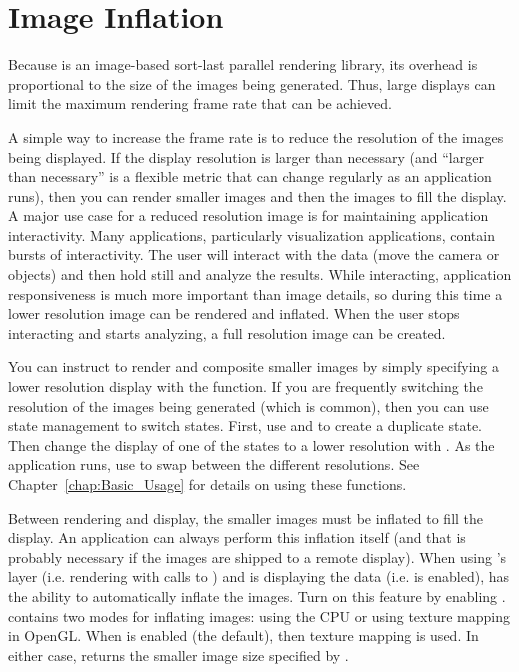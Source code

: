 


\section{Image Inflation}
\label{sec:Customizing_Compositing:Image_Inflation}

Because \IceT is an image-based sort-last parallel
rendering library, its overhead is proportional to the size of the images
being generated.  Thus, large displays can limit the maximum rendering
frame rate that can be achieved.

A simple way to increase the frame rate is to reduce the resolution of the
images being displayed.  If the display resolution is larger than necessary
(and ``larger than necessary'' is a flexible metric that can change
regularly as an application runs), then you can render smaller images and
then  the images to fill the display.  A major use case
for a reduced resolution image is for maintaining application
interactivity.  Many applications, particularly visualization applications,
contain bursts of interactivity.  The user will interact with the data
(move the camera or objects) and then hold still and analyze the results.
While interacting, application responsiveness is much more important than
image details, so during this time a lower resolution image can be rendered
and inflated.  When the user stops interacting and starts analyzing, a full
resolution image can be created.

You can instruct \IceT to render and composite smaller images by simply
specifying a lower resolution display with the 
function.  If you are frequently switching the resolution of the images
being generated (which is common), then you can use \IceT state management
to switch states.  First, use  and
 to create a duplicate state.  Then change the display
of one of the states to a lower resolution with .  As
the application runs, use  to swap between the
different resolutions.  See Chapter~\ref{chap:Basic_Usage} for details on
using these functions.

Between rendering and display, the smaller images must be inflated to fill
the display.  An application can always perform this inflation itself (and
that is probably necessary if the images are shipped to a remote display).
When using \IceT's \OpenGL layer (i.e. rendering with calls to
) and \IceT is displaying the data
(i.e.  is enabled), \IceT has the ability to
automatically inflate the images.  Turn on this feature by enabling
.  \IceT contains two modes for inflating
images: using the CPU or using texture mapping in OpenGL.  When
 is enabled (the
default), then texture mapping is used.  In either case,
 returns the smaller image size specified by
.

